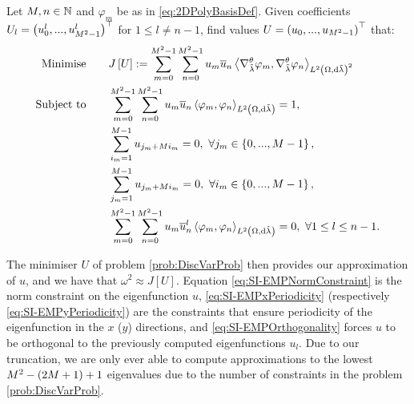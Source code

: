 \begin{problem} \label{prob:DiscVarProb}
	Let $M,n\in\mathbb{N}$ and $\varphi_m$ be as in \eqref{eq:2DPolyBasisDef}.
	Given coefficients $U_l=\left( u^l_0,...,u^l_{M^2-1} \right)^\top$ for $1\leq l\neq n-1$, find values $U=\left( u_0,...,u_{M^2-1} \right)^\top$ that:
	\begin{subequations} \label{eq:SI-ExampleMinProb}
		\begin{align}
			\text{Minimise} \quad & \quad J\left[ U \right] := \sum_{m=0}^{M^2-1}\sum_{n=0}^{M^2-1}u_m\overline{u}_n\left\langle \nabla^{\theta}_{\tilde{\lambda}}\varphi_m , \nabla^{\theta}_{\tilde{\lambda}}\varphi_n \right\rangle_{L^{2}\left( \Omega,\mathrm{d}\tilde{\lambda} \right)^2} 
			\label{eq:SI-EMPObjectiveFn} \\
			\text{Subject to} \quad & \quad \sum_{m=0}^{M^2-1}\sum_{n=0}^{M^2-1}u_m\overline{u}_n\left\langle \varphi_m , \varphi_n \right\rangle_{L^{2}\left( \Omega,\mathrm{d}\tilde{\lambda} \right)} = 1, 
			\label{eq:SI-EMPNormConstraint} \\
			& \quad \sum_{i_m=1}^{M-1}u_{j_m+Mi_m} = 0, \ \forall j_m\in\left\{ 0,...,M-1 \right\}, 
			\label{eq:SI-EMPxPeriodicity} \\
			& \quad \sum_{j_m=1}^{M-1}u_{j_m+Mi_m} = 0, \ \forall i_m\in\left\{ 0,...,M-1 \right\},
			\label{eq:SI-EMPyPeriodicity} \\
			& \quad \sum_{m=0}^{M^2-1}\sum_{n=0}^{M^2-1}u_m\overline{u}^l_n\left\langle \varphi_m , \varphi_n \right\rangle_{L^{2}\left( \Omega,\mathrm{d}\tilde{\lambda} \right)} = 0, \ \forall 1\leq l\leq n-1.
			\label{eq:SI-EMPOrthogonality}
		\end{align}
	\end{subequations}
\end{problem}
The minimiser $U$ of problem \ref{prob:DiscVarProb} then provides our approximation of $u$, and we have that $\omega^2 \approx J[U]$.
Equation \eqref{eq:SI-EMPNormConstraint} is the norm constraint on the eigenfunction $u$, \eqref{eq:SI-EMPxPeriodicity} (respectively \eqref{eq:SI-EMPyPeriodicity}) are the constraints that ensure periodicity of the eigenfunction in the $x$ ($y$) directions, and \eqref{eq:SI-EMPOrthogonality} forces $u$ to be orthogonal to the previously computed eigenfunctions $u_l$.
Due to our truncation, we are only ever able to compute approximations to the lowest $M^2 - \left( 2M + 1 \right) + 1$ eigenvalues due to the number of constraints in the problem \ref{prob:DiscVarProb}.


